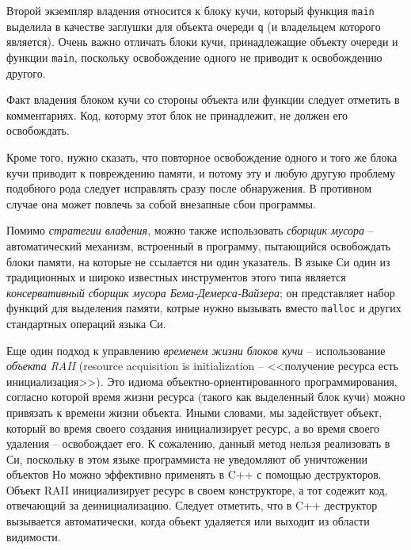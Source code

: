 \documentclass[%
	11pt,
	a4paper,
	utf8,
		]{article}
\begin{document}
Второй экземпляр владения относится к блоку кучи, который функция \verb|main| выделила в качестве заглушки для объекта очереди \verb|q| (и владельцем которого является). Очень важно отличать блоки кучи, принадлежащие объекту очереди и функции \verb|main|, поскольку освобождение одного не приводит к освобождению другого.

Факт владения блоком кучи со стороны объекта или функции следует отметить в комментариях. Код, которму этот блок не принадлежит, не должен его освобождать.

Кроме того, нужно сказать, что повторное освобождение одного и того же блока кучи приводит к повреждению памяти, и потому эту и любую другую проблему подобного рода следует исправлять сразу после обнаружения. В противном случае она может повлечь за собой внезапные сбои программы.

Помимо \emph{стратегии владения}, можно также использовать \emph{сборщик мусора} -- автоматический механизм, встроенный в программу, пытающийся освобождать блоки памяти, на которые не ссылается ни один указатель. В языке Си один из традиционных и широко известных инструментов этого типа является \emph{консервативный сборщик мусора Бема-Демерса-Вайзера}; он представляет набор функций для выделения памяти, котрые нужно вызывать вместо \verb|malloc| и других стандартных операций языка Си.

Еще один подход к управлению \emph{временем жизни блоков кучи} -- использование \emph{объекта RAII} (resource acquisition is initialization -- <<получение ресурса есть инициализация>>). Это идиома объектно-ориентированного программирования, согласно которой время жизни ресурса (такого как выделенный блок кучи) можно привязать к времени жизни объекта. Иными словами, мы задействует объект, который во время своего создания инициализирует ресурс, а во время своего удаления -- освобождает его. {\color{red}К сожалению, данный метод нельзя реализовать в Си, поскольку в этом языке программиста не уведомляют об уничтожении объектов} Но можно эффективно применять в C++ с помощью деструкторов. Объект RAII инициализирует ресурс в своем конструкторе, а тот содежит код, отвечающий за деинициализацию. Следует отметить, что в C++ деструктор вызывается автоматически, когда объект удаляется или выходит из области видимости. 
\end{document}
